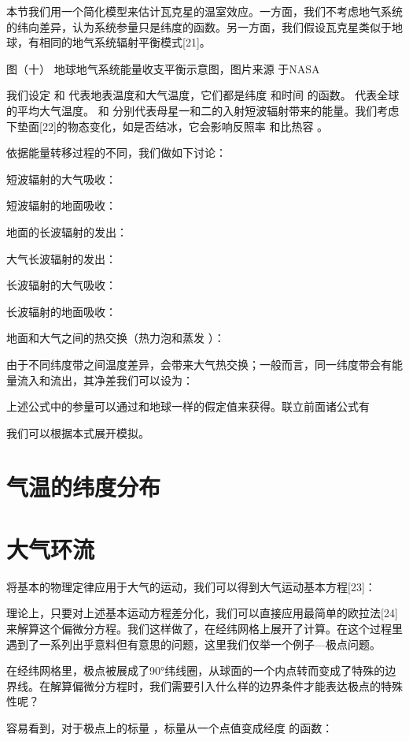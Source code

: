 \documentclass[a4paper,10.5pt]{book}
\begin{document}
本节我们用一个简化模型来估计瓦克星的温室效应。一方面，我们不考虑地气系统的纬向差异，认为系统参量只是纬度的函数。另一方面，我们假设瓦克星类似于地球，有相同的地气系统辐射平衡模式[21]。


图（十）
地球地气系统能量收支平衡示意图，图片来源 于NASA

我们设定  和  代表地表温度和大气温度，它们都是纬度  和时间  的函数。   代表全球的平均大气温度。 和   分别代表母星一和二的入射短波辐射带来的能量。我们考虑下垫面[22]的物态变化，如是否结冰，它会影响反照率  和比热容  。

依据能量转移过程的不同，我们做如下讨论：

短波辐射的大气吸收：

短波辐射的地面吸收：

地面的长波辐射的发出：

大气长波辐射的发出：

长波辐射的大气吸收：

长波辐射的地面吸收：

地面和大气之间的热交换（热力泡和蒸发 ）：

由于不同纬度带之间温度差异，会带来大气热交换；一般而言，同一纬度带会有能量流入和流出，其净差我们可以设为：

上述公式中的参量可以通过和地球一样的假定值来获得。联立前面诸公式有

我们可以根据本式展开模拟。


\section{气温的纬度分布}

\section{大气环流}

将基本的物理定律应用于大气的运动，我们可以得到大气运动基本方程[23]：



理论上，只要对上述基本运动方程差分化，我们可以直接应用最简单的欧拉法[24]来解算这个偏微分方程。我们这样做了，在经纬网格上展开了计算。在这个过程里遇到了一系列出乎意料但有意思的问题，这里我们仅举一个例子—极点问题。

在经纬网格里，极点被展成了90°纬线圈，从球面的一个内点转而变成了特殊的边界线。在解算偏微分方程时，我们需要引入什么样的边界条件才能表达极点的特殊性呢？

容易看到，对于极点上的标量  ，标量从一个点值变成经度  的函数：
\end{document}
